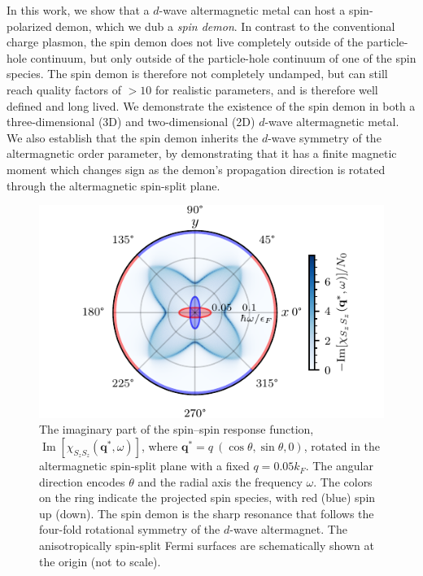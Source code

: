\documentclass[aps,prl,reprint,twocolumns,superscriptaddress]{revtex4-2}
\DeclareMathOperator{\Imm}{Im}
\newcommand{\kF}{k_{F}}
\begin{document}
	
	In this work, we show that a $d$-wave altermagnetic metal can host a spin-polarized demon, which we dub a \emph{spin demon}. In contrast to the conventional charge plasmon, the spin demon does not live completely outside of the particle-hole continuum, but only outside of the particle-hole continuum of one of the spin species. The spin demon is therefore not completely undamped, but can still reach quality factors of $>10$ for realistic parameters, and is therefore well defined and long lived. We demonstrate the existence of the spin demon in both a three-dimensional (3D) and two-dimensional (2D) $d$-wave altermagnetic metal. We also establish that the spin demon inherits the $d$-wave symmetry of the altermagnetic order parameter, by demonstrating that it has a finite magnetic moment which changes sign as the demon's propagation  direction is rotated through the altermagnetic spin-split plane.
	\begin{figure}
		\centering
		\includegraphics[width=\columnwidth]{polar-plot-chiSzSz}
		\caption{
			The imaginary part of the spin–spin response function, $\Imm[\chi_{S_zS_z}(\bm q^*,\omega)]$, where $\bm q^*=q\ (\cos\theta,\sin\theta,0)$, rotated in the altermagnetic spin-split plane with a fixed $q=0.05\kF$. The angular direction encodes $\theta$ and the radial axis the frequency $\omega$. The colors on the ring indicate the projected spin species, with red (blue) spin up (down). The spin demon is the sharp resonance that follows the four-fold rotational symmetry of the $d$-wave altermagnet. The anisotropically spin-split Fermi surfaces are schematically shown at the origin (not to scale). \label{fig:polar}
		}
	\end{figure}
	
\end{document}
